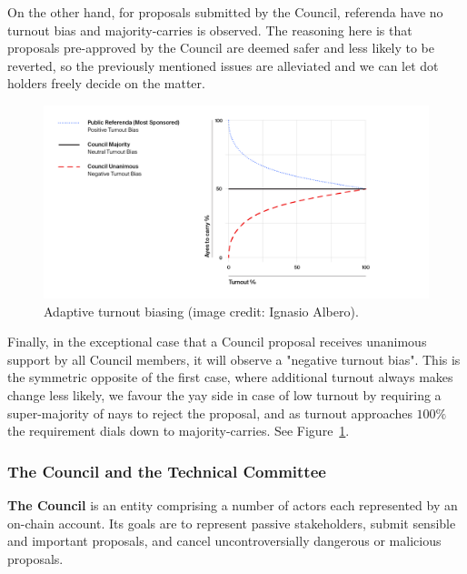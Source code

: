 On the other hand, for proposals submitted by the Council, referenda have no turnout bias and majority-carries is observed. The reasoning here is that proposals pre-approved by the Council are deemed safer and less likely to be reverted, so the previously mentioned issues are alleviated and we can let dot holders freely decide on the matter. 

\begin{figure}[htb]
  \centering
  \includegraphics[width=1.1\textwidth]{images/Turnout-Bias.png}
  \caption{Adaptive turnout biasing (image credit: Ignasio Albero).}
    \label{fig:biasing}
\end{figure}


Finally, in the exceptional case that a Council proposal receives unanimous support by all Council members, it will observe a "negative turnout bias". This is the symmetric opposite of the first case, where additional turnout always makes change less likely, we favour the yay side in case of low turnout by requiring a super-majority of nays to reject the proposal, and as turnout approaches $100\%$ the requirement dials down to majority-carries. See Figure~\ref{fig:biasing}.


\subsubsection{The Council and the Technical Committee}\label{s:council}

\textbf{The Council} is an entity comprising a number of actors each represented by an on-chain account. Its goals are to represent passive stakeholders, submit sensible and important proposals, and cancel uncontroversially dangerous or malicious proposals.

